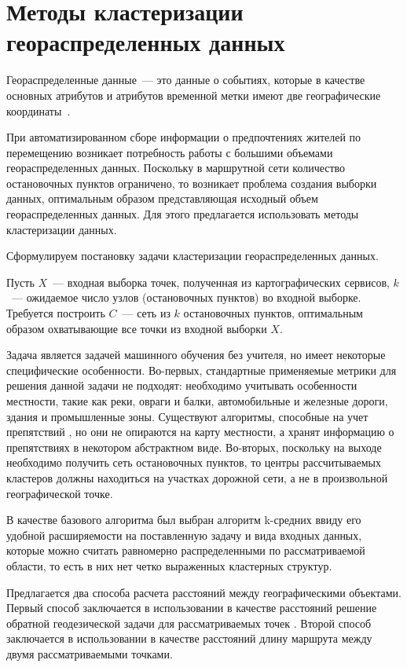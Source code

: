 \chapter{Методы кластеризации геораспределенных данных}
Геораспределенные данные~--- это данные о событиях, которые в качестве основных атрибутов и атрибутов временной метки имеют две географические координаты~\cite{RFFI}.

При автоматизированном сборе информации о предпочтениях жителей по перемещению возникает потребность работы с большими объемами геораспределенных данных. Поскольку в маршрутной сети количество остановочных пунктов ограничено, то возникает проблема создания выборки данных, оптимальным образом представляющая исходный объем геораспределенных данных. Для этого предлагается использовать методы кластеризации данных.

Сформулируем постановку задачи кластеризации геораспределенных данных.

Пусть \( X \)~--- входная выборка точек, полученная из картографических сервисов, \( k \)~--- ожидаемое число узлов (остановочных пунктов) во входной выборке. Требуется построить \( C \)~--- сеть из \( k \) остановочных пунктов, оптимальным образом охватывающие все точки из входной выборки \( X \).

Задача является задачей машинного обучения без учителя, но имеет некоторые специфические особенности. Во-первых, стандартные применяемые метрики для решения данной задачи не подходят: необходимо учитывать особенности местности, такие как реки, овраги и балки, автомобильные и железные дороги, здания и промышленные зоны. Существуют алгоритмы, способные на учет препятствий \cite{estivill, obstacles, cod}, но они не опираются на карту местности, а хранят информацию о препятствиях в некотором абстрактном виде. Во-вторых, поскольку на выходе необходимо получить сеть остановочных пунктов, то центры рассчитываемых кластеров должны находиться на участках дорожной сети, а не в произвольной географической точке.

В качестве базового алгоритма был выбран алгоритм k-средних ввиду его удобной расширяемости на поставленную задачу и вида входных данных, которые можно считать равномерно распределенными по рассматриваемой области, то есть в них нет четко выраженных кластерных структур.

Предлагается два способа расчета расстояний между географическими объектами. Первый способ заключается в использовании в качестве расстояний решение обратной геодезической задачи для рассматриваемых точек \cite{geodesic}. Второй способ заключается в использовании в качестве расстояний длину маршрута между двумя рассматриваемыми точками.

